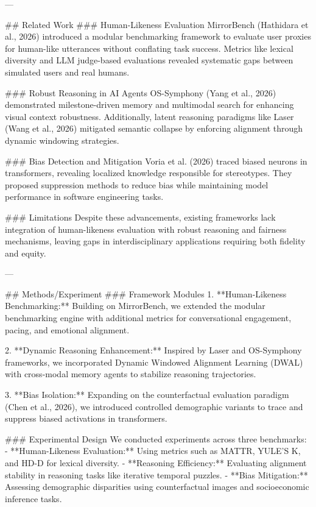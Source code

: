 ---

## Related Work  
### Human-Likeness Evaluation  
MirrorBench (Hathidara et al., 2026) introduced a modular benchmarking framework to evaluate user proxies for human-like utterances without conflating task success. Metrics like lexical diversity and LLM judge-based evaluations revealed systematic gaps between simulated users and real humans.  

### Robust Reasoning in AI Agents  
OS-Symphony (Yang et al., 2026) demonstrated milestone-driven memory and multimodal search for enhancing visual context robustness. Additionally, latent reasoning paradigms like Laser (Wang et al., 2026) mitigated semantic collapse by enforcing alignment through dynamic windowing strategies.  

### Bias Detection and Mitigation  
Voria et al. (2026) traced biased neurons in transformers, revealing localized knowledge responsible for stereotypes. They proposed suppression methods to reduce bias while maintaining model performance in software engineering tasks.  

### Limitations  
Despite these advancements, existing frameworks lack integration of human-likeness evaluation with robust reasoning and fairness mechanisms, leaving gaps in interdisciplinary applications requiring both fidelity and equity.  

---

## Methods/Experiment  
### Framework Modules  
1. **Human-Likeness Benchmarking:**  
   Building on MirrorBench, we extended the modular benchmarking engine with additional metrics for conversational engagement, pacing, and emotional alignment.  

2. **Dynamic Reasoning Enhancement:**  
   Inspired by Laser and OS-Symphony frameworks, we incorporated Dynamic Windowed Alignment Learning (DWAL) with cross-modal memory agents to stabilize reasoning trajectories.  

3. **Bias Isolation:**  
   Expanding on the counterfactual evaluation paradigm (Chen et al., 2026), we introduced controlled demographic variants to trace and suppress biased activations in transformers.  

### Experimental Design  
We conducted experiments across three benchmarks:  
- **Human-Likeness Evaluation:** Using metrics such as MATTR, YULE'S K, and HD-D for lexical diversity.  
- **Reasoning Efficiency:** Evaluating alignment stability in reasoning tasks like iterative temporal puzzles.  
- **Bias Mitigation:** Assessing demographic disparities using counterfactual images and socioeconomic inference tasks.  

